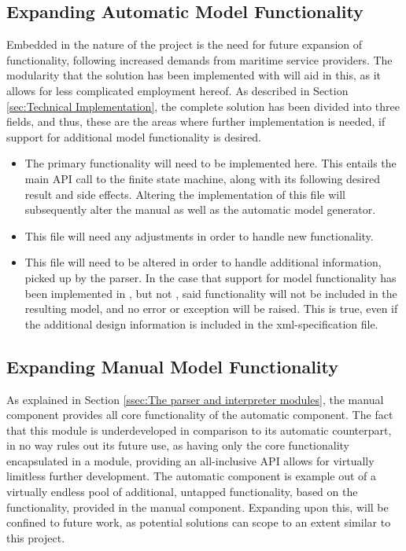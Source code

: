 \subsection{Expanding Automatic Model Functionality}
Embedded in the nature of the project is the need for future expansion of functionality, following increased demands from maritime service providers. The modularity that the solution has been implemented with will aid in this, as it allows for less complicated employment hereof. As described in Section \ref{sec:Technical Implementation}, the complete solution has been divided into three fields, and thus, these are the areas where further implementation is needed, if support for additional model functionality is desired.
\begin{itemize}
  \item {}
    The primary functionality will need to be implemented here. This entails the main API call to the finite state machine, along with its following desired result and side effects. Altering the implementation of this file will subsequently alter the manual as well as the automatic model generator.
  \item {}
    This file will  need any adjustments in order to handle new functionality.
  \item {}
    This file will need to be altered in order to handle additional information, picked up by the parser. In the case that support for model functionality has been implemented in , but not , said functionality will not be included in the resulting model, and no error or exception will be raised. This is true, even if the additional design information is included in the xml-specification file.
\end{itemize}

\subsection{Expanding Manual Model Functionality}
As explained in Section \ref{ssec:The parser and interpreter modules}, the manual component provides all core functionality of the automatic component. The fact that this module is underdeveloped in comparison to its automatic counterpart, in no way rules out its future use, as having only the core functionality encapsulated in a module, providing an all-inclusive API allows for virtually limitless further development. The automatic component is  example out of a virtually endless pool of additional, untapped functionality, based on the functionality, provided in the manual component. Expanding upon this, will be confined to future work, as potential solutions can scope to an extent similar to this project.


